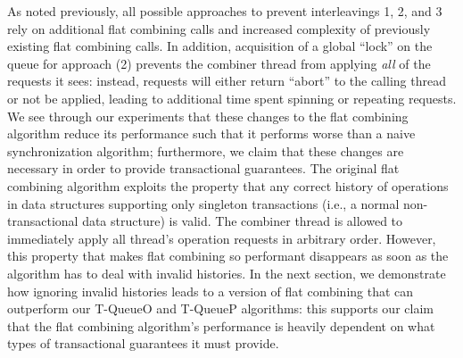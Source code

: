 As noted previously, all possible approaches to prevent interleavings 1, 2, and 3 rely on additional flat combining calls and increased complexity of previously existing flat combining calls. In addition, acquisition of a global ``lock'' on the queue for approach (2) prevents the combiner thread from applying \emph{all} of the requests it sees: instead, requests will either return ``abort'' to the calling thread or not be applied, leading to additional time spent spinning or repeating requests. We see through our experiments that these changes to the flat combining algorithm reduce its performance such that it performs worse than a naive synchronization algorithm; furthermore, we claim that these changes are necessary in order to provide transactional guarantees. The original flat combining algorithm exploits the property that any correct history of operations in data structures supporting only singleton transactions (i.e., a normal non-transactional data structure) is valid. The combiner thread is allowed to immediately apply all thread's operation requests in arbitrary order. However, this property that makes flat combining so performant disappears as soon as the algorithm has to deal with invalid histories. In the next section, we demonstrate how ignoring invalid histories leads to a version of flat combining that can outperform our T-QueueO and T-QueueP algorithms: this supports our claim that the flat combining algorithm's performance is heavily dependent on what types of transactional guarantees it must provide.
